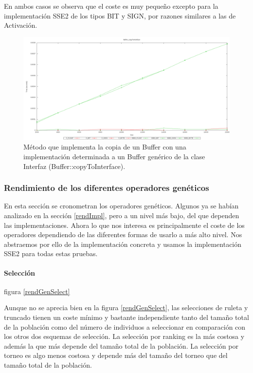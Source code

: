 \documentclass[11pt]{article}
\begin{document}
\begin{titlepage}
En ambos casos se observa que el coste es muy pequeño excepto para la implementación SSE2 de los tipos BIT y SIGN, por razones similares a las de Activación.

\begin{figure}[htb]
\centering
\includegraphics[width=\textwidth]{./img/Buffer_copyToInterface.png}
\caption{\label{grafImplCopyTo}Método que implementa la copia de un Buffer con una implementación determinada a un Buffer genérico de la clase Interfaz (Buffer::copyToInterface).}
\end{figure}
\newpage
\subsubsection{Rendimiento de los diferentes operadores genéticos}
\label{sec-6-1-2}

   \label{rendOperadores}

En esta sección se cronometran los operadores genéticos. Algunos ya se habían analizado en la sección \ref{rendImpl}, pero a un nivel más bajo, del que dependen las implementaciones. Ahora lo que nos interesa es principalmente el coste de los operadores dependiendo de las diferentes formas de usarlo a más alto nivel. Nos abstraemos por ello de la implementación concreta y usamos la implementación SSE2 para todas estas pruebas.
\paragraph{Selección}
\label{sec-6-1-2-1}


figura \ref{rendGenSelect}

Aunque no se aprecia bien en la figura \ref{rendGenSelect}, las selecciones de ruleta y truncado tienen un coste mínimo y bastante independiente tanto del tamaño total de la población como del número de individuos a seleccionar en comparación con los otros dos esquemas de selección. La selección por ranking es la más costosa y además la que más depende del tamaño total de la población. La selección por torneo es algo menos costosa y depende más del tamaño del torneo que del tamaño total de la población.


\end{titlepage}
\end{document}
